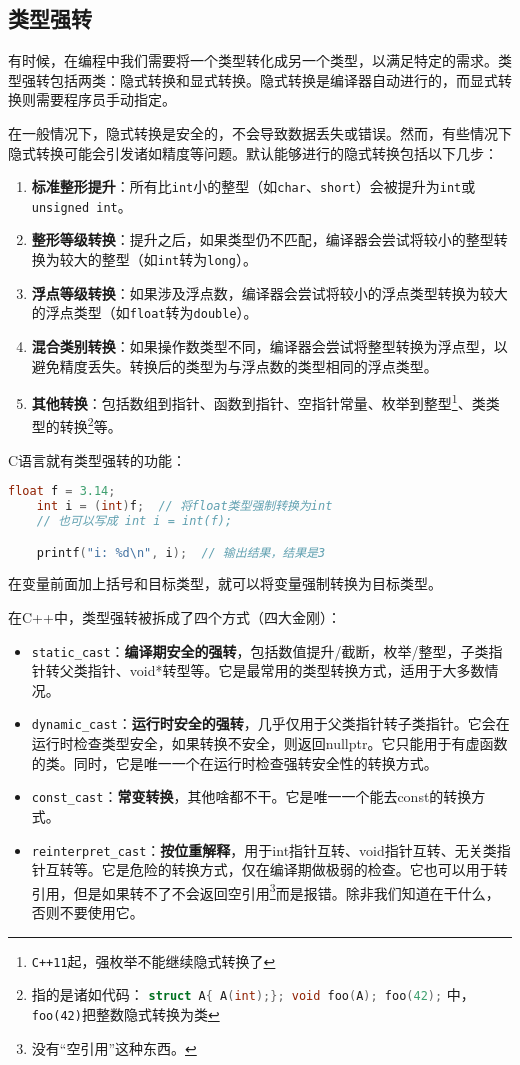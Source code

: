 \documentclass[../main.tex]{subfiles}
\begin{document}
\subsection{类型强转}

有时候，在编程中我们需要将一个类型转化成另一个类型，以满足特定的需求。类型强转包括两类：隐式转换和显式转换。隐式转换是编译器自动进行的，而显式转换则需要程序员手动指定。

在一般情况下，隐式转换是安全的，不会导致数据丢失或错误。然而，有些情况下隐式转换可能会引发诸如精度等问题。默认能够进行的隐式转换包括以下几步：
\begin{enumerate}
  \item \textbf{标准整形提升}：所有比\texttt{int}小的整型（如\texttt{char}、\texttt{short}）会被提升为\texttt{int}或\texttt{unsigned int}。
  \item \textbf{整形等级转换}：提升之后，如果类型仍不匹配，编译器会尝试将较小的整型转换为较大的整型（如\texttt{int}转为\texttt{long}）。
  \item \textbf{浮点等级转换}：如果涉及浮点数，编译器会尝试将较小的浮点类型转换为较大的浮点类型（如\texttt{float}转为\texttt{double}）。
  \item \textbf{混合类别转换}：如果操作数类型不同，编译器会尝试将整型转换为浮点型，以避免精度丢失。转换后的类型为与浮点数的类型相同的浮点类型。
  \item \textbf{其他转换}：包括数组到指针、函数到指针、空指针常量、枚举到整型\footnote{\texttt{C++11}起，强枚举不能继续隐式转换了}、类类型的转换\footnote{指的是诸如代码： \lstinline[language=c++]|struct A{ A(int);}; void foo(A); foo(42);| 中，\texttt{foo(42)}把整数隐式转换为类}等。
\end{enumerate}

C语言就有类型强转的功能：
\begin{lstlisting}[language=C++]
    float f = 3.14;
    int i = (int)f;  // 将float类型强制转换为int
    // 也可以写成 int i = int(f);

    printf("i: %d\n", i);  // 输出结果，结果是3
\end{lstlisting}
在变量前面加上括号和目标类型，就可以将变量强制转换为目标类型。

在C++中，类型强转被拆成了四个方式（四大金刚）：
\begin{itemize}
  \item \texttt{static\_cast}：\textbf{编译期安全的强转}，包括数值提升/截断，枚举/整型，子类指针转父类指针、void*转型等。它是最常用的类型转换方式，适用于大多数情况。
  \item \texttt{dynamic\_cast}：\textbf{运行时安全的强转}，几乎仅用于父类指针转子类指针。它会在运行时检查类型安全，如果转换不安全，则返回nullptr。它只能用于有虚函数的类。同时，它是唯一一个在运行时检查强转安全性的转换方式。
  \item \texttt{const\_cast}：\textbf{常变转换}，其他啥都不干。它是唯一一个能去const的转换方式。
  \item \texttt{reinterpret\_cast}：\textbf{按位重解释}，用于int指针互转、void指针互转、无关类指针互转等。它是危险的转换方式，仅在编译期做极弱的检查。它也可以用于转引用，但是如果转不了不会返回空引用\footnote{没有“空引用”这种东西。}而是报错。除非我们知道在干什么，否则不要使用它。
\end{itemize}
\end{document}
